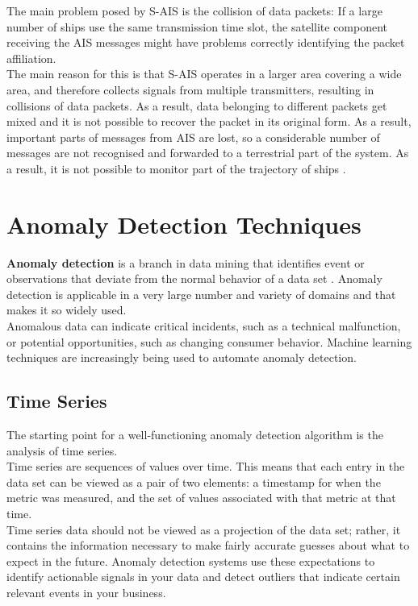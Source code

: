     The main problem posed by S-AIS is the collision of data packets: If a large number of ships use the same transmission time slot, the satellite component receiving the AIS messages might have problems correctly identifying the packet affiliation.
    \\
    The main reason for this is that S-AIS operates in a larger area covering a wide area, and therefore collects signals from multiple transmitters, resulting in collisions of data packets.
    As a result, data belonging to different packets get mixed and it is not possible to recover the packet in its original form. As a result, important parts of messages from AIS are lost, so a considerable number of messages are not recognised and forwarded to a terrestrial part of the system. As a result, it is not possible to monitor part of the trajectory of ships \cite{dbscan_ais}.
    
    
    
\clearpage  

\section{Anomaly Detection Techniques}

    \textbf{Anomaly detection} is a branch in data mining that identifies event or observations that deviate from the normal behavior of a data set \cite{anomaly_detection}. Anomaly detection is applicable in a very large number and variety of domains and that makes it so widely used.
    \\
    Anomalous data can indicate critical incidents, such as a technical malfunction, or potential opportunities, such as changing consumer behavior. Machine learning techniques are increasingly being used to automate anomaly detection.
    
    \subsection{Time Series}
    The starting point for a well-functioning anomaly detection algorithm is the analysis of time series.
    \\
    Time series are sequences of values over time. This means that each entry in the data set can be viewed as a pair of two elements: a timestamp for when the metric was measured, and the set of values associated with that metric at that time. 
    \\ 
    Time series data should not be viewed as a projection of the data set; rather, it contains the information necessary to make fairly accurate guesses about what to expect in the future. Anomaly detection systems use these expectations to identify actionable signals in your data and detect outliers that indicate certain relevant events in your business.
    

